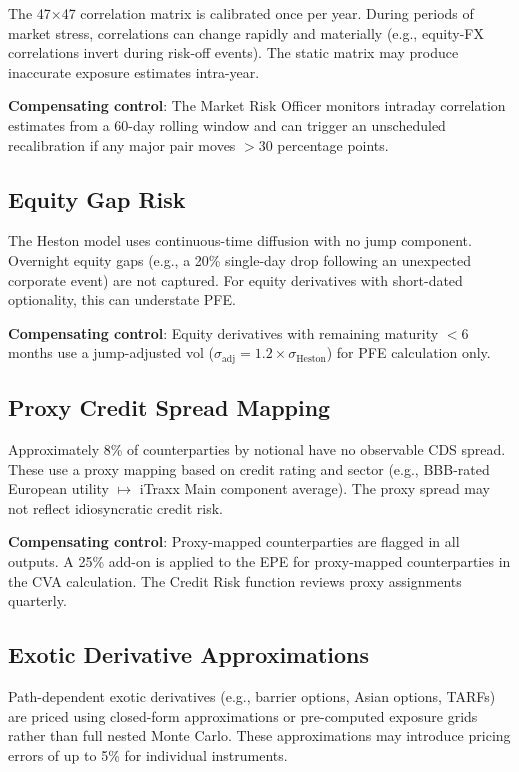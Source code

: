 \documentclass[11pt,a4paper]{article}
\begin{document}
The 47$\times$47 correlation matrix is calibrated once per year. During periods
of market stress, correlations can change rapidly and materially (e.g.,
equity-FX correlations invert during risk-off events). The static matrix may
produce inaccurate exposure estimates intra-year.

\textbf{Compensating control}: The Market Risk Officer monitors intraday
correlation estimates from a 60-day rolling window and can trigger an
unscheduled recalibration if any major pair moves $>30$ percentage points.

\subsection{Equity Gap Risk}

The Heston model uses continuous-time diffusion with no jump component.
Overnight equity gaps (e.g., a 20\% single-day drop following an unexpected
corporate event) are not captured. For equity derivatives with short-dated
optionality, this can understate PFE.

\textbf{Compensating control}: Equity derivatives with remaining maturity
$<6$ months use a jump-adjusted vol ($\sigma_{\text{adj}} = 1.2 \times
\sigma_{\text{Heston}}$) for PFE calculation only.

\subsection{Proxy Credit Spread Mapping}

Approximately 8\% of counterparties by notional have no observable CDS spread.
These use a proxy mapping based on credit rating and sector (e.g., BBB-rated
European utility $\mapsto$ iTraxx Main component average). The proxy spread
may not reflect idiosyncratic credit risk.

\textbf{Compensating control}: Proxy-mapped counterparties are flagged in all
outputs. A 25\% add-on is applied to the EPE for proxy-mapped counterparties
in the CVA calculation. The Credit Risk function reviews proxy assignments
quarterly.

\subsection{Exotic Derivative Approximations}

Path-dependent exotic derivatives (e.g., barrier options, Asian options, TARFs)
are priced using closed-form approximations or pre-computed exposure grids
rather than full nested Monte Carlo. These approximations may introduce pricing
errors of up to 5\% for individual instruments.
\end{document}
